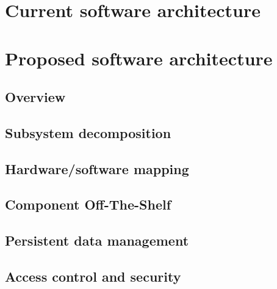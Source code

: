 \documentclass[11pt]{article}
\begin{document}
			
	
	\section{Current software architecture}
	
			
		
	\section{Proposed software architecture}	
		\subsection{Overview}
		
			
		
		\subsection{Subsystem decomposition}
		
			
			
		\subsection{Hardware/software mapping}
	
			
			
		\subsection{Component Off-The-Shelf}
		
			
	
		\subsection{Persistent data management}	
		
			
			
		\subsection{Access control and security}
		
			
		
\end{document}
